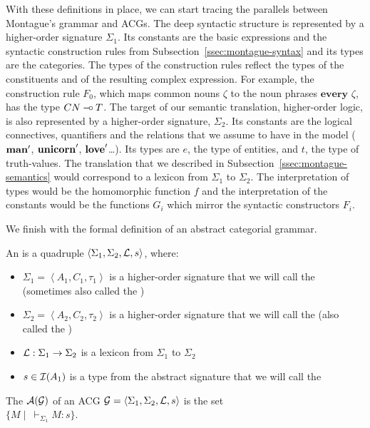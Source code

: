 With these definitions in place, we can start tracing the parallels between
Montague's grammar and ACGs. The deep syntactic structure is represented by
a higher-order signature $\Sigma_1$. Its constants are the basic
expressions and the syntactic construction rules from
Subsection~\ref{ssec:montague-syntax} and its types are the categories. The
types of the construction rules reflect the types of the constituents and
of the resulting complex expression. For example, the construction rule
$F_0$, which maps common nouns $\zeta$ to the noun phrases
$\textbf{every }\zeta$, has the type $CN \mathbin{{-}\mkern-3.5mu{\circ}} T$. The target of our
semantic translation, higher-order logic, is also represented by a
higher-order signature, $\Sigma_2$. Its constants are the logical
connectives, quantifiers and the relations that we assume to have in the
model ($\textbf{man}'$, $\textbf{unicorn}'$, $\textbf{love}'$\ldots). Its types are
$e$, the type of entities, and $t$, the type of truth-values. The
translation that we described in Subsection~\ref{ssec:montague-semantics}
would correspond to a lexicon from $\Sigma_1$ to $\Sigma_2$. The
interpretation of types would be the homomorphic function $f$ and the
interpretation of the constants would be the functions $G_i$ which mirror
the syntactic constructors $F_i$.

We finish with the formal definition of an abstract categorial grammar.

\begin{definition}
  An  is a quadruple $\left< \Sigma_1,
    \Sigma_2, \mathcal{L}, s \right>$, where:

  \begin{itemize}
  \item $\Sigma_1 = \left< A_1, C_1, \tau_1 \right>$ is a higher-order
    signature that we will call the  (sometimes
    also called the )
  \item $\Sigma_2 = \left< A_2, C_2, \tau_2 \right>$ is a higher-order
    signature that we will call the  (also called
    the )
  \item $\mathcal{L} : \Sigma_1 \to \Sigma_2$ is a lexicon from $\Sigma_1$ to
    $\Sigma_2$
  \item $s \in \mathcal{I}(A_1)$ is a type from the abstract signature that we will
    call the 
  \end{itemize}
\end{definition}

\begin{definition}
  The  $\mathcal{A}(\mathcal{G})$ of an ACG
  $\mathcal{G} = \left< \Sigma_1, \Sigma_2, \mathcal{L}, s \right>$ is the set \\
  $\{ M \mid \ \vdash_{\Sigma_1} M : s \}$.
\end{definition}

